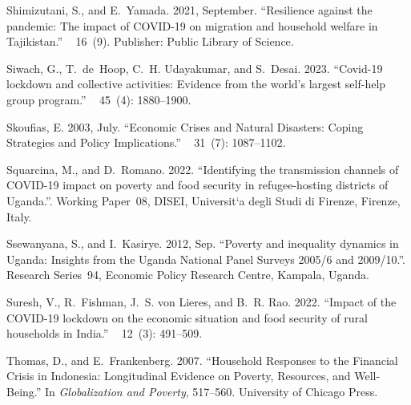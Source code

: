 \documentclass{wber}
\begin{document}
\begin{thebibliography}{}
Shimizutani, S., and E.~Yamada. 2021, September.
\newblock ``Resilience against the pandemic: {The} impact of {COVID}-19 on
  migration and household welfare in {Tajikistan}.''
~{ 16\/}~(9).
\newblock Publisher: Public Library of Science.

Siwach, G., T.~de~Hoop, C.~H. Udayakumar, and S.~Desai. 2023.
\newblock ``Covid-19 lockdown and collective activities: Evidence from the
  world's largest self-help group program.''
~{ 45\/}~(4):
  1880--1900.

Skoufias, E. 2003, July.
\newblock ``Economic {Crises} and {Natural} {Disasters}: {Coping} {Strategies}
  and {Policy} {Implications}.''
~{ 31\/}~(7):
  1087--1102.

Squarcina, M., and D.~Romano. 2022.
\newblock ``Identifying the transmission channels of {COVID}-19 impact on
  poverty and food security in refugee-hosting districts of {Uganda}.''.
\newblock Working Paper~08, DISEI, Universit`a degli Studi di Firenze, Firenze,
  Italy.

Ssewanyana, S., and I.~Kasirye. 2012, Sep.
\newblock ``Poverty and inequality dynamics in {Uganda}: Insights from the
  {Uganda National Panel Surveys} 2005/6 and 2009/10.''.
\newblock Research Series~94, Economic Policy Research Centre, Kampala, Uganda.

Suresh, V., R.~Fishman, J.~S. von Lieres, and B.~R. Rao. 2022.
\newblock ``Impact of the {COVID-19} lockdown on the economic situation and
  food security of rural households in {India}.''
~{ 12\/}~(3): 491--509.

Thomas, D., and E.~Frankenberg. 2007.
\newblock ``Household {Responses} to the {Financial} {Crisis} in {Indonesia}:
  {Longitudinal} {Evidence} on {Poverty}, {Resources}, and {Well}-{Being}.''
\newblock In {\em Globalization and {Poverty}},  517--560. University of
  Chicago Press.


\end{thebibliography}
\end{document}
